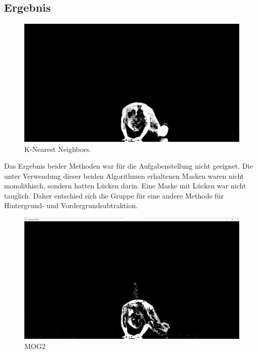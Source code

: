 \documentclass[12pt]{scrartcl}
\begin{document}
\subsection{Ergebnis}
\begin{figure}
  \includegraphics[width=\linewidth]{knn.png}
  \caption{K-Nearest Neighbors.}
  \label{fig:knn}
\end{figure}
Das Ergebnis beider Methoden war f\"ur die Aufgabenstellung nicht geeignet. Die unter Verwendung dieser beiden Algorithmen erhaltenen Masken waren nicht monolithisch, sondern hatten L\"ucken darin. Eine Maske mit L\"ucken war nicht tauglich.
Daher entschied sich die Gruppe f\"ur eine andere Methode f\"ur Hintergrund- und Vordergrundsubtraktion.\\
\begin{figure}
  \includegraphics[width=\linewidth]{mog2.png}
  \caption{MOG2}
  \label{fig:mog2}
\end{figure}



\end{document}
